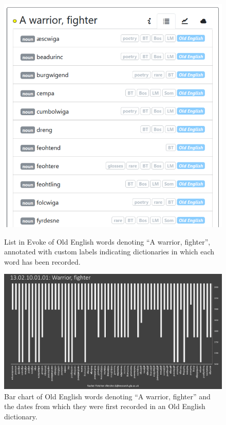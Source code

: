 \begin{figure}[h]
\centering
\begin{minipage}{.48\textwidth}
  \includegraphics[width=\textwidth]{Stolk2021x/fig/Fletcher-warrior.png}
	\caption[]{\label{fig:Stolk2021x:Fletcher-fig1}List in Evoke of Old English words denoting ``A warrior, fighter'', annotated with custom labels indicating dictionaries in which each word has been recorded.}
\end{minipage}
\begin{minipage}{.04\textwidth}\end{minipage}
\begin{minipage}{.48\textwidth}
  \includegraphics[width=\textwidth]{Stolk2021x/fig/Fletcher-warrior-barcode.png}
	\caption[]{\label{fig:Stolk2021x:Fletcher-fig2}Bar chart of Old English words denoting ``A warrior, fighter'' and the dates from which they were first recorded in an Old English dictionary.}
\end{minipage}
\end{figure}

